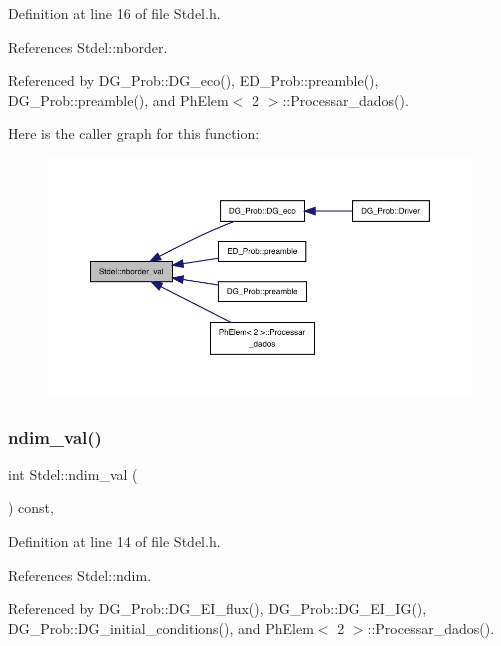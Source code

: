 Definition at line 16 of file Stdel.\+h.



References Stdel\+::nborder.



Referenced by D\+G\+\_\+\+Prob\+::\+D\+G\+\_\+eco(), E\+D\+\_\+\+Prob\+::preamble(), D\+G\+\_\+\+Prob\+::preamble(), and Ph\+Elem$<$ 2 $>$\+::\+Processar\+\_\+dados().

Here is the caller graph for this function\+:
\nopagebreak
\begin{figure}[H]
\begin{center}
\leavevmode
\includegraphics[width=350pt]{classStdel_aac8e97661e46c48fafa91f13caa03a9f_icgraph}
\end{center}
\end{figure}
\mbox{\label{classStdel_a383df930bee8dc298d7d412b3b632ebb}} 
\subsubsection{\texorpdfstring{ndim\+\_\+val()}{ndim\_val()}}
{\footnotesize\ttfamily int Stdel\+::ndim\+\_\+val (\begin{DoxyParamCaption}{ }\end{DoxyParamCaption}) const\hspace{0.3cm}{\ttfamily [inline]}, {\ttfamily [inherited]}}



Definition at line 14 of file Stdel.\+h.



References Stdel\+::ndim.



Referenced by D\+G\+\_\+\+Prob\+::\+D\+G\+\_\+\+E\+I\+\_\+flux(), D\+G\+\_\+\+Prob\+::\+D\+G\+\_\+\+E\+I\+\_\+\+I\+G(), D\+G\+\_\+\+Prob\+::\+D\+G\+\_\+initial\+\_\+conditions(), and Ph\+Elem$<$ 2 $>$\+::\+Processar\+\_\+dados().

